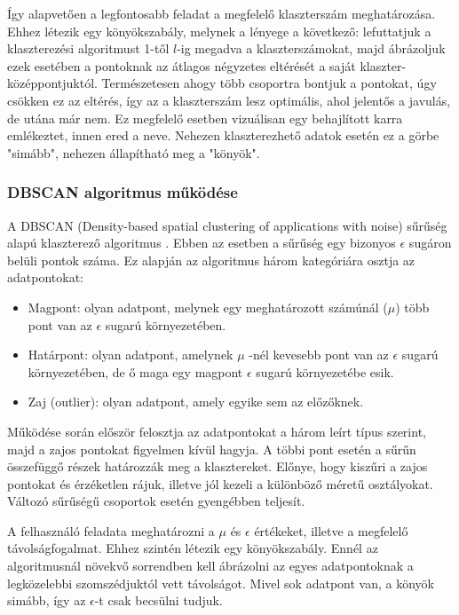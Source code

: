 \documentclass[12pt]{article}
\begin{document}
Így alapvetően a legfontosabb feladat a megfelelő klaszterszám meghatározása. Ehhez létezik egy könyökszabály, melynek a lényege a következő: lefuttatjuk a klaszterezési algoritmust 1-től $l$-ig megadva a klaszterszámokat, majd ábrázoljuk ezek esetében a pontoknak az átlagos négyzetes eltérését a saját klaszter-középpontjuktól. Természetesen ahogy több csoportra bontjuk a pontokat, úgy csökken ez az eltérés, így az a klaszterszám lesz optimális, ahol jelentős a javulás, de utána már nem. Ez megfelelő esetben vizuálisan egy behajlított karra emlékeztet, innen ered a neve. Nehezen klaszterezhető adatok esetén ez a görbe "simább", nehezen állapítható meg a "könyök".

\subsubsection{DBSCAN algoritmus működése}

A DBSCAN (Density-based spatial clustering of applications with noise) sűrűség alapú klaszterező algoritmus
. Ebben az esetben a sűrűség egy bizonyos $\epsilon$ sugáron belüli pontok száma. Ez alapján az algoritmus három kategóriára osztja az adatpontokat:
\begin{itemize}
\item Magpont: olyan adatpont, melynek egy meghatározott számúnál ($\mu$) több pont van az $\epsilon$ sugarú környezetében.
\item Határpont: olyan adatpont, amelynek $\mu$ -nél kevesebb pont van az $\epsilon$ sugarú környezetében, de ő maga egy magpont $\epsilon$ sugarú környezetébe esik.
\item Zaj (outlier): olyan adatpont, amely egyike sem az előzőknek.
\end{itemize}

Működése során először felosztja az adatpontokat a három leírt típus szerint, majd a zajos pontokat figyelmen kívül hagyja. A többi pont esetén a sűrűn összefüggő részek határozzák meg a klasztereket. Előnye, hogy kiszűri a zajos pontokat és érzéketlen rájuk, illetve jól kezeli a különböző méretű osztályokat. Változó sűrűségű csoportok esetén gyengébben teljesít.

A felhasználó feladata meghatározni a $\mu$ és $\epsilon$ értékeket, illetve a megfelelő távolságfogalmat. Ehhez szintén létezik egy könyökszabály. Ennél az algoritmusnál növekvő sorrendben kell ábrázolni az egyes adatpontoknak a legközelebbi szomszédjuktól vett távolságot. Mivel sok adatpont van, a könyök simább, így az $\epsilon$-t csak becsülni tudjuk. 
\end{document}
